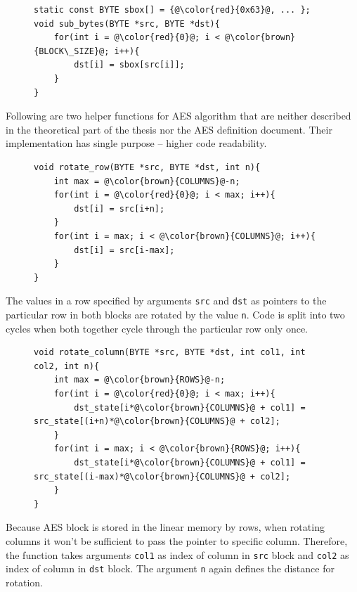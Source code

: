 \begin{figure}[H]
\begin{lstlisting}
static const BYTE sbox[] = {@\color{red}{0x63}@, ... };
void sub_bytes(BYTE *src, BYTE *dst){
    for(int i = @\color{red}{0}@; i < @\color{brown}{BLOCK\_SIZE}@; i++){
        dst[i] = sbox[src[i]];
    }
}
\end{lstlisting}
\end{figure}                                                                    

Following are two helper functions for AES algorithm that are neither described 
in the theoretical part of the thesis nor the AES definition document. Their
implementation has single purpose -- higher code readability.

\begin{figure}[H]
\begin{lstlisting}
void rotate_row(BYTE *src, BYTE *dst, int n){
    int max = @\color{brown}{COLUMNS}@-n;
    for(int i = @\color{red}{0}@; i < max; i++){
        dst[i] = src[i+n];    
    }
    for(int i = max; i < @\color{brown}{COLUMNS}@; i++){
        dst[i] = src[i-max];
    }
}
\end{lstlisting}
\end{figure}

The values in a row specified by arguments \texttt{src} and \texttt{dst} as 
pointers to the particular row in both blocks are rotated by the value 
\texttt{n}. Code is split into two cycles when both together cycle through the 
particular row only once. 

\begin{figure}[H]
\begin{lstlisting}
void rotate_column(BYTE *src, BYTE *dst, int col1, int col2, int n){
    int max = @\color{brown}{ROWS}@-n;
    for(int i = @\color{red}{0}@; i < max; i++){
        dst_state[i*@\color{brown}{COLUMNS}@ + col1] = src_state[(i+n)*@\color{brown}{COLUMNS}@ + col2];
    }
    for(int i = max; i < @\color{brown}{ROWS}@; i++){
        dst_state[i*@\color{brown}{COLUMNS}@ + col1] = src_state[(i-max)*@\color{brown}{COLUMNS}@ + col2];
    }
}
\end{lstlisting}
\end{figure}

Because AES block is stored in the linear memory by rows, when rotating columns
it won't be sufficient to pass the pointer to specific column. Therefore,
the function takes arguments \texttt{col1} as index of column in \texttt{src}
block and \texttt{col2} as index of column in \texttt{dst} block. The argument
\texttt{n} again defines the distance for rotation.
 
